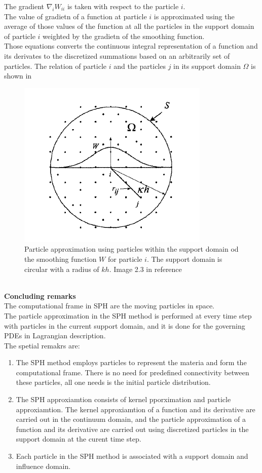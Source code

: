 \documentclass[12pt]{book}
\begin{document}
The gradient $\nabla_i W_{ii}$ is taken with respect to the particle $i$.\\
The value of gradietn of a function at particle $i$ is approximated using the average of those values of the function at all the particles in the support domain of particle $i$ weighted by the gradietn of the smoothing function.\\
Those equations converts the continuous integral representation of a function and its derivates to the discretized summations based on an arbitrarily set of particles.
The relation of particle $i$ and the particles $j$ in its support domain $\Omega$ is shown in
\begin{figure}[h!]
\centering
\includegraphics[scale=.8]{./images/ParticleApprox.png}
\caption{Particle approximation using particles within the support domain od the smoothing function $W$ for particle $i$. The support domain is circular with a radius of $kh$. Image 2.3 in reference \cite{Liu_SPH}}
\label{ParticleApprox}
\end{figure}
\\\textbf{Concluding remarks}\\
The computational frame in SPH are the moving particles in space.\\
The particle approximation in the SPH method is performed at every time step with particles in the current support domain, and it is done for the governing PDEs in Lagrangian description.\\
The spetial remakrs are:
\begin{enumerate}
\item The SPH method employs particles to represent the materia and form the computational frame. There is no need for predefined connectivity between these particles, all one needs is the initial particle distribution.
\item The SPH approxiamtion consists of kernel pporximation and particle approxiamtion. The kernel approxiamtion of a function and its derivative are carried out in the continuum domain, and the particle approximation of a function and its derivative are carried out using discretized particles in the support domain at the curent time step.
\item Each particle in the SPH method is associated with a support domain and influence domain.
\end{enumerate}
\end{document}
